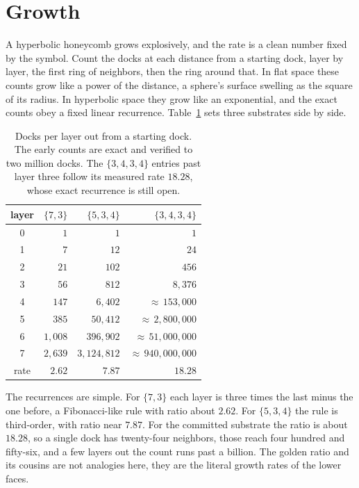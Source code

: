 \section{Growth}

A hyperbolic honeycomb grows explosively, and the rate is a clean number fixed by the symbol. Count the docks at each distance from a starting dock, layer by layer, the first ring of neighbors, then the ring around that. In flat space these counts grow like a power of the distance, a sphere's surface swelling as the square of its radius. In hyperbolic space they grow like an exponential, and the exact counts obey a fixed linear recurrence. Table~\ref{tab:growth} sets three substrates side by side.

\begin{table}[ht]
\centering
\begin{tabular}{@{}crrr@{}}
\toprule
layer & $\{7,3\}$ & $\{5,3,4\}$ & $\{3,4,3,4\}$ \\
\midrule
0 & $1$ & $1$ & $1$ \\
1 & $7$ & $12$ & $24$ \\
2 & $21$ & $102$ & $456$ \\
3 & $56$ & $812$ & $8{,}376$ \\
4 & $147$ & $6{,}402$ & ${\approx}\,153{,}000$ \\
5 & $385$ & $50{,}412$ & ${\approx}\,2{,}800{,}000$ \\
6 & $1{,}008$ & $396{,}902$ & ${\approx}\,51{,}000{,}000$ \\
7 & $2{,}639$ & $3{,}124{,}812$ & ${\approx}\,940{,}000{,}000$ \\
\midrule
rate & $2.62$ & $7.87$ & $18.28$ \\
\bottomrule
\end{tabular}
\caption{Docks per layer out from a starting dock. The early counts are exact and verified to two million docks. The $\{3,4,3,4\}$ entries past layer three follow its measured rate $18.28$, whose exact recurrence is still open.}
\label{tab:growth}
\end{table}

The recurrences are simple. For $\{7,3\}$ each layer is three times the last minus the one before, a Fibonacci-like rule with ratio about $2.62$. For $\{5,3,4\}$ the rule is third-order, with ratio near $7.87$. For the committed substrate the ratio is about $18.28$, so a single dock has twenty-four neighbors, those reach four hundred and fifty-six, and a few layers out the count runs past a billion. The golden ratio and its cousins are not analogies here, they are the literal growth rates of the lower faces. \cite{pollard2026vibetest}

